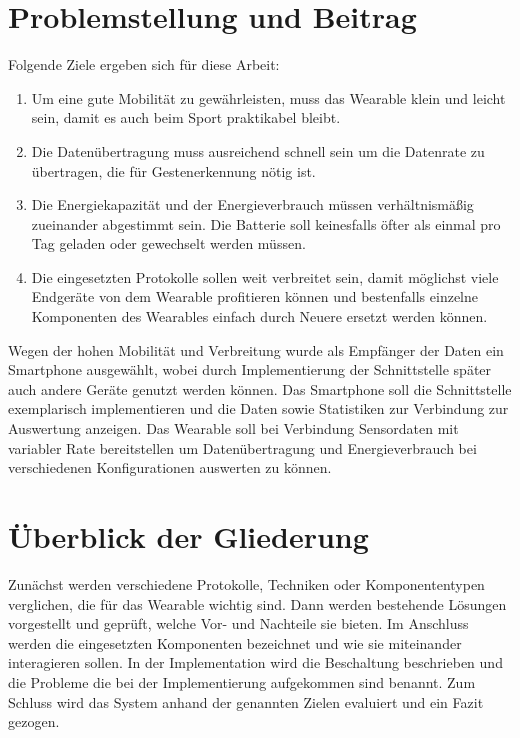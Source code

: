 \section{Problemstellung und Beitrag}
Folgende Ziele ergeben sich für diese Arbeit:
\begin{enumerate}
	\item Um eine gute Mobilität zu gewährleisten, muss das Wearable klein und leicht sein, damit es auch beim Sport praktikabel bleibt.
	\item Die Datenübertragung muss ausreichend schnell sein um die Datenrate zu übertragen, die für Gestenerkennung nötig ist.
	\item Die Energiekapazität und der Energieverbrauch müssen verhältnismäßig zueinander abgestimmt sein.
	Die Batterie soll keinesfalls öfter als einmal pro Tag geladen oder gewechselt werden müssen.
	\item Die eingesetzten Protokolle sollen weit verbreitet sein, damit möglichst viele Endgeräte von dem Wearable profitieren können und bestenfalls einzelne Komponenten des Wearables einfach durch Neuere ersetzt werden können.
\end{enumerate}
Wegen der hohen Mobilität und Verbreitung wurde als Empfänger der Daten ein Smartphone ausgewählt, wobei durch Implementierung der Schnittstelle später auch andere Geräte genutzt werden können.
Das Smartphone soll die Schnittstelle exemplarisch implementieren und die Daten sowie Statistiken zur Verbindung zur Auswertung anzeigen.
Das Wearable soll bei Verbindung Sensordaten mit variabler Rate bereitstellen um Datenübertragung und Energieverbrauch bei verschiedenen Konfigurationen auswerten zu können.

\section{Überblick der Gliederung}
Zunächst werden verschiedene Protokolle, Techniken oder Komponententypen verglichen, die für das Wearable wichtig sind.
Dann werden bestehende Lösungen vorgestellt und geprüft, welche Vor- und Nachteile sie bieten.
Im Anschluss werden die eingesetzten Komponenten bezeichnet und wie sie miteinander interagieren sollen.
In der Implementation wird die Beschaltung beschrieben und die Probleme die bei der Implementierung aufgekommen sind benannt.
Zum Schluss wird das System anhand der genannten Zielen evaluiert und ein Fazit gezogen.
